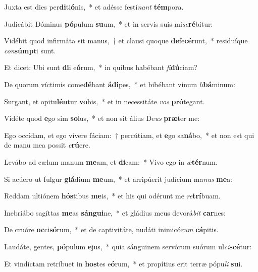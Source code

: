 \item Juxta est dies per\textbf{di}ti\textbf{ó}nis,~* et adésse festí\textit{nant} \textbf{tém}pora.
\item Judicábit Dóminus \textbf{pó}pulum \textbf{su}um,~* et in servis suis mi\textit{se}\textbf{ré}bitur:
\item Vidébit quod infirmáta sit manus,~† et clausi quoque \textbf{de}fe\textbf{cé}runt,~* residuíque \textit{con}\textbf{súmp}ti sunt.
\item Et dicet: Ubi sunt \textbf{di}i e\textbf{ó}rum,~* in quibus habébant \textit{fi}\textbf{dú}ciam?
\item De quorum víctimis come\textbf{dé}bant \textbf{á}\textbf{di}pes,~* et bibébant vinum \textit{li}\textbf{bá}minum:
\item Surgant, et opitu\textbf{lén}tur \textbf{vo}bis,~* et in necessitáte \textit{vos} \textbf{pró}tegant.
\item Vidéte quod \textbf{e}go sim \textbf{so}lus,~* et non sit álius De\textit{us} \textbf{præ}ter me:
\item Ego occídam, et ego vívere fáciam:~† percútiam, et \textbf{e}go sa\textbf{ná}bo,~* et non est qui de manu mea possit \textit{e}\textbf{rú}ere.
\item Levábo ad cælum manum \textbf{me}am, et \textbf{di}cam:~* Vivo ego in \textit{æ}\textbf{tér}num.
\item Si acúero ut fulgur \textbf{glá}dium \textbf{me}um,~* et arripúerit judícium ma\textit{nus} \textbf{me}a:
\item Reddam ultiónem \textbf{hós}tibus \textbf{me}is,~* et his qui odérunt me \textit{re}\textbf{trí}buam.
\item Inebriábo sagíttas \textbf{me}as \textbf{sán}\textbf{gui}ne,~* et gládius meus devorá\textit{bit} \textbf{car}nes:
\item De cruóre \textbf{oc}ci\textbf{só}rum,~* et de captivitáte, nudáti inimicó\textit{rum} \textbf{cá}pitis.
\item Laudáte, gentes, \textbf{pó}pulum \textbf{e}jus,~* quia sánguinem servórum suórum ul\textit{ci}\textbf{scé}tur:
\item Et vindíctam retríbuet in \textbf{hos}tes e\textbf{ó}rum,~* et propítius erit terræ pópu\textit{li} \textbf{su}i.
